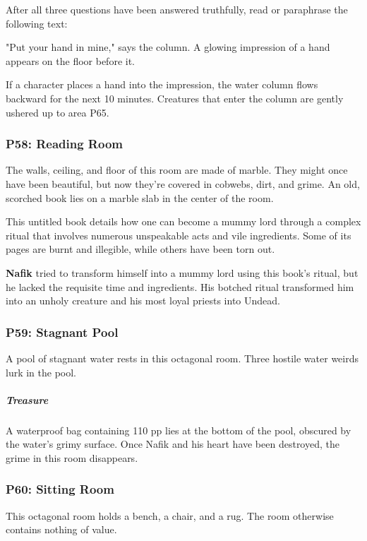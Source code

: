 \documentclass[10pt,a4paper,twoside,bg=print,twocolumn,openany,nodeprecatedcode]{dndbook}
\begin{document}
After all three questions have been answered truthfully, read or paraphrase the following text:

\begin{DndReadAloud}{}
"Put your hand in mine," says the column. A glowing impression of a hand appears on the floor before it.

\end{DndReadAloud}

If a character places a hand into the impression, the water column flows backward for the next 10 minutes. Creatures that enter the column are gently ushered up to area P65.

\subsubsection{P58: Reading Room}
\begin{DndReadAloud}{}
The walls, ceiling, and floor of this room are made of marble. They might once have been beautiful, but now they're covered in cobwebs, dirt, and grime. An old, scorched book lies on a marble slab in the center of the room.

\end{DndReadAloud}

This untitled book details how one can become a mummy lord through a complex ritual that involves numerous unspeakable acts and vile ingredients. Some of its pages are burnt and illegible, while others have been torn out.

\textbf{Nafik} tried to transform himself into a mummy lord using this book's ritual, but he lacked the requisite time and ingredients. His botched ritual transformed him into an unholy creature and his most loyal priests into Undead.

\subsubsection{P59: Stagnant Pool}
A pool of stagnant water rests in this octagonal room. Three hostile water weirds lurk in the pool.

\subparagraph{Treasure}
A waterproof bag containing 110 pp lies at the bottom of the pool, obscured by the water's grimy surface. Once Nafik and his heart have been destroyed, the grime in this room disappears.

\subsubsection{P60: Sitting Room}
This octagonal room holds a bench, a chair, and a rug. The room otherwise contains nothing of value.
\end{document}
